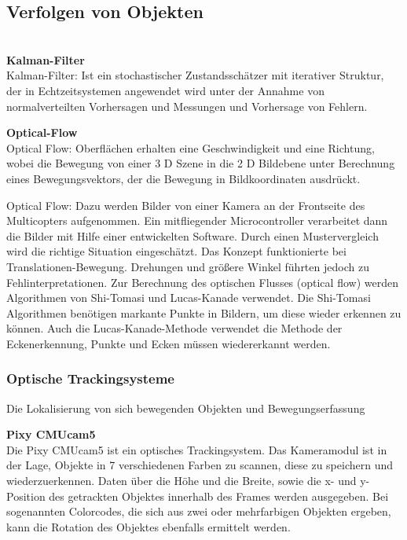     \subsection*{Verfolgen von Objekten}\\

    \textbf{Kalman-Filter}\\
    Kalman-Filter: Ist ein stochastischer Zustandsschätzer mit iterativer Struktur, der in Echtzeitsystemen angewendet wird unter der Annahme von normalverteilten Vorhersagen und Messungen und Vorhersage von Fehlern.

    \textbf{Optical-Flow}\\
    Optical Flow: Oberflächen erhalten eine Geschwindigkeit und eine Richtung, wobei die Bewegung von einer 3 D Szene in die 2 D Bildebene unter Berechnung eines Bewegungsvektors, der die Bewegung in Bildkoordinaten ausdrückt.

    Optical Flow:
    Dazu werden Bilder von einer Kamera an der Frontseite des Multicopters aufgenommen. Ein mitfliegender Microcontroller verarbeitet dann die Bilder mit Hilfe einer entwickelten Software. Durch einen Mustervergleich wird die richtige Situation eingeschätzt. Das Konzept funktionierte bei Translationen-Bewegung. Drehungen und größere Winkel führten jedoch zu Fehlinterpretationen. Zur Berechnung des optischen Flusses (optical flow) werden Algorithmen von Shi-Tomasi und Lucas-Kanade verwendet. Die Shi-Tomasi Algorithmen benötigen markante Punkte in Bildern, um diese wieder erkennen zu können. Auch die Lucas-Kanade-Methode verwendet die Methode der Eckenerkennung, Punkte und Ecken müssen wiedererkannt werden. \cite{opticalflow}

    \subsubsection{Optische Trackingsysteme}

    Die Lokalisierung von sich bewegenden Objekten und Bewegungserfassung

    \textbf{Pixy CMUcam5}\\
    Die Pixy CMUcam5 ist ein optisches Trackingsystem. Das Kameramodul ist in der Lage, Objekte in 7 verschiedenen Farben zu scannen, diese zu speichern und wiederzuerkennen. Daten über die Höhe und die Breite, sowie die x- und y-Position des getrackten Objektes innerhalb des Frames werden ausgegeben. Bei sogenannten Colorcodes, die sich aus zwei oder mehrfarbigen Objekten ergeben, kann die Rotation des Objektes ebenfalls ermittelt werden.

